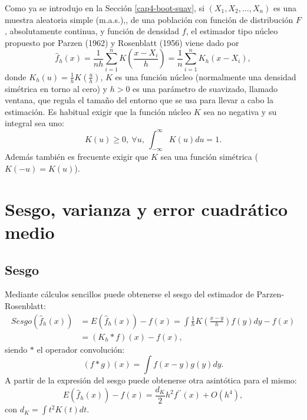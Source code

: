 \documentclass[]{book}
\theoremstyle{definition}
\theoremstyle{definition}
\theoremstyle{definition}
\theoremstyle{remark}
\begin{document}
Como ya se introdujo en la Sección \ref{cap4-boot-suav}, si
\(\left( X_1, X_2, \ldots, X_n \right)\) es una muestra aleatoria simple
(m.a.s.),, de una población con función de distribución \(F\),
absolutamente continua, y función de densidad \(f\), el estimador tipo
núcleo propuesto por Parzen (1962) y Rosenblatt (1956) viene dado por
\[\hat{f}_{h}\left( x \right) =\frac{1}{nh}\sum_{i=1}^{n}K\left( \frac{x-X_i}{
h} \right) =\frac{1}{n}\sum_{i=1}^{n}K_{h}\left( x-X_i \right),\] donde
\(K_{h}\left( u \right) =\frac{1}{h}K\left( \frac{u}{h} \right)\), \(K\)
es una función núcleo (normalmente una densidad simétrica en torno al
cero) y \(h>0\) es una parámetro de suavizado, llamado ventana, que
regula el tamaño del entorno que se usa para llevar a cabo la
estimación. Es habitual exigir que la función núcleo \(K\) sea no
negativa y su integral sea uno:
\[K\left( u \right) \geq 0,~\forall u,~\int_{-\infty }^{\infty }
K\left( u \right) du=1.\] Además también es frecuente exigir que \(K\)
sea una función simétrica (\(K\left( -u \right) =K\left( u \right)\)).

\section{Sesgo, varianza y error cuadrático
medio}\label{sesgo-varianza-y-error-cuadratico-medio}

\subsection{Sesgo}\label{sesgo}

Mediante cálculos sencillos puede obtenerse el sesgo del estimador de
Parzen-Rosenblatt: \[\begin{aligned}
Sesgo\left( \hat{f}_{h}\left( x \right) \right) &= E\left( \hat{f}_{h}\left(
x \right) \right) -f\left( x \right) =\int \frac{1}{h}K\left( \frac{x-y}{h}
 \right) f\left( y \right) dy-f\left( x \right) \\
&= \left( K_{h}\ast f \right) \left( x \right) -f\left( x \right),
\end{aligned}\] siendo \(\ast\) el operador convolución:
\[\left( f\ast g \right) \left( x \right) 
= \int f\left( x-y \right) g\left( y \right) dy.\] A partir de la
expresión del sesgo puede obtenerse otra asintótica para el mismo:
\[E\left( \hat{f}_{h}\left( x \right) \right) -f\left( x \right) =\frac{d_{K}}{2}
h^2f^{\prime \prime }\left( x \right) +O\left( h^{4} \right),\]con
\(d_{K}=\int t^2K\left( t \right) dt\).
\end{document}
